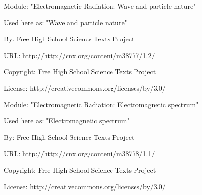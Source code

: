       \par\vspace{9pt}\noindent\begin{minipage}{\textwidth}
      Module: "Electromagnetic Radiation: Wave and particle nature" \par\nopagebreak\noindent
      Used here as: "Wave and particle nature" \par\nopagebreak\noindent
        By: Free High School Science Texts Project\par\nopagebreak\noindent
      URL: http://http://cnx.org/content/m38777/1.2/\par\nopagebreak\noindent
      \par\nopagebreak\noindent
      Copyright: Free High School Science Texts Project\par\nopagebreak\noindent
      License:  http://creativecommons.org/licenses/by/3.0/\par\nopagebreak\noindent
      \par\end{minipage}
      \par\vspace{9pt}\noindent\begin{minipage}{\textwidth}
      Module: "Electromagnetic Radiation: Electromagnetic spectrum" \par\nopagebreak\noindent
      Used here as: "Electromagnetic spectrum" \par\nopagebreak\noindent
        By: Free High School Science Texts Project\par\nopagebreak\noindent
      URL: http://http://cnx.org/content/m38778/1.1/\par\nopagebreak\noindent
      \par\nopagebreak\noindent
      Copyright: Free High School Science Texts Project\par\nopagebreak\noindent
      License:  http://creativecommons.org/licenses/by/3.0/\par\nopagebreak\noindent
      \par\end{minipage}
